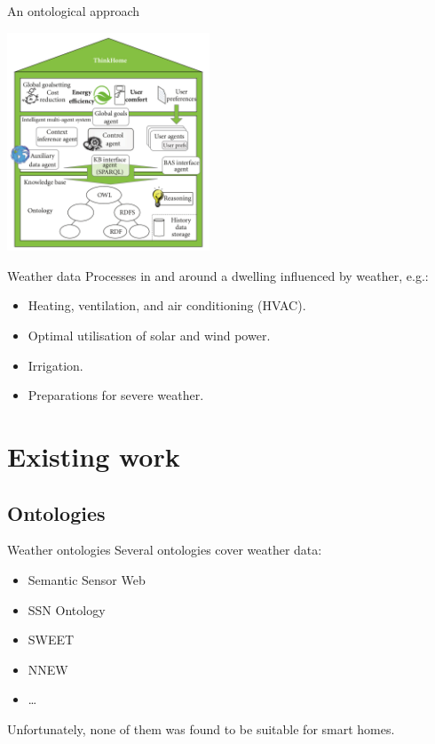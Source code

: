 \documentclass{beamer}
\begin{document}
\begin{frame}{An ontological approach}
	\begin{center}
		\vspace{-.5cm}
		\includegraphics[height=6.5cm]{figures/thinkhome}
	\end{center}
\end{frame}

\begin{frame}{Weather data}
	Processes in and around a dwelling influenced by weather, e.g.:
	\begin{itemize}
		\item Heating, ventilation, and air conditioning (HVAC).
		\item Optimal utilisation of solar and wind power.
		\item Irrigation.
		\item Preparations for severe weather.
	\end{itemize}
\end{frame}

\section{Existing work}

\subsection{Ontologies}

\begin{frame}{Weather ontologies}
	Several ontologies cover weather data:
	\begin{itemize}
		\item Semantic Sensor Web
		\item SSN Ontology
		\item SWEET
		\item NNEW
		\item …
	\end{itemize}

	Unfortunately, none of them was found to be suitable for smart homes.
\end{frame}
\end{document}
